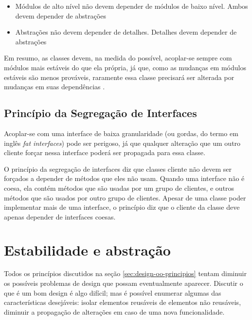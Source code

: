 \begin{itemize}
	\item Módulos de alto nível não devem depender de módulos de baixo nível. 
	Ambos devem depender de abstrações
	\item Abstrações não devem depender de detalhes. Detalhes devem depender de
	abstrações
\end{itemize}

Em resumo, as classes devem, na medida do possível, acoplar-se sempre com módulos mais
estáveis do que ela própria, já que, como as mudanças em módulos estáveis são
menos prováveis, raramente essa classe precisará ser alterada por mudanças em
suas dependências \cite{bobmartin-oodmetrics}.

\subsection{Princípio da Segregação de Interfaces}
\label{subsec:isp}

Acoplar-se com uma interface de baixa granularidade (ou gordas, do termo
em inglês \textit{fat interfaces}) pode ser perigoso, já que qualquer alteração
que um outro cliente forçar nessa interface poderá ser propagada para essa
classe.

O princípio da segregação de interfaces diz que classes cliente não devem ser
forçados a depender de métodos que eles não usam. Quando uma interface não é
coesa, ela contém métodos que são usadas por um grupo de clientes, e outros 
métodos que são usados por outro grupo de clientes. Apesar de uma classe poder 
implementar mais de uma interface, o princípio diz que o cliente da classe deve
apenas depender de interfaces coesas.

\section{Estabilidade e abstração}
\label{sec:estabilidade-e-abstracao}

Todos os princípios discutidos na seção \ref{sec:design-oo-principios} tentam
diminuir os possíveis problemas de design que possam eventualmente aparecer.
Discutir o que é um bom design é algo difícil; mas é possível enumerar algumas
das características desejáveis: isolar elementos reusáveis de elementos não
reusáveis, diminuir a propagação de alterações em caso de uma nova
funcionalidade.

